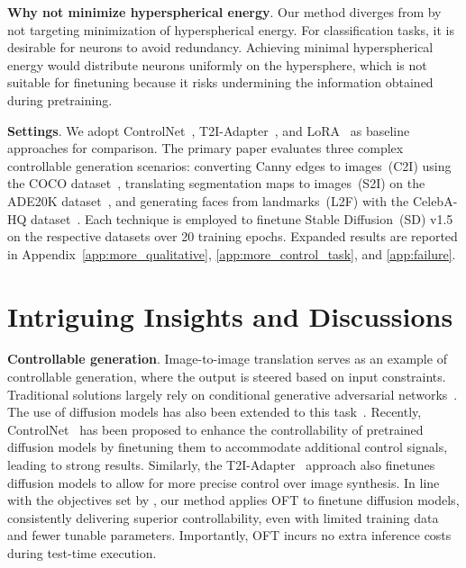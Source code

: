 \textbf{Why not minimize hyperspherical energy}. Our method diverges from \cite{liu2021orthogonal} by not targeting minimization of hyperspherical energy. For classification tasks, it is desirable for neurons to avoid redundancy. Achieving minimal hyperspherical energy would distribute neurons uniformly on the hypersphere, which is not suitable for finetuning because it risks undermining the information obtained during pretraining.

\textbf{Settings}. We adopt ControlNet~\cite{zhang2023adding}, T2I-Adapter~\cite{mou2023t2i}, and LoRA~\cite{hulora2022} as baseline approaches for comparison. The primary paper evaluates three complex controllable generation scenarios: converting Canny edges to images~(C2I) using the COCO dataset~\cite{lin2014microsoft}, translating segmentation maps to images~(S2I) on the ADE20K dataset~\cite{zhou2017scene}, and generating faces from landmarks~(L2F) with the CelebA-HQ dataset~\cite{karras2018progressive,xia2021tedigan}. Each technique is employed to finetune Stable Diffusion~(SD) v1.5 on the respective datasets over 20 training epochs. Expanded results are reported in Appendix~\ref{app:more_qualitative}, \ref{app:more_control_task}, and \ref{app:failure}.

\section{Intriguing Insights and Discussions}

\textbf{Controllable generation}. Image-to-image translation serves as an example of controllable generation, where the output is steered based on input constraints. Traditional solutions largely rely on conditional generative adversarial networks~\cite{isola2017image,zhu2017toward,wang2018high,park2019semantic,choi2018stargan}. The use of diffusion models has also been extended to this task~\cite{saharia2022palette,voynov2022sketch,wang2022pretraining}. Recently, ControlNet~\cite{zhang2023adding} has been proposed to enhance the controllability of pretrained diffusion models by finetuning them to accommodate additional control signals, leading to strong results. Similarly, the T2I-Adapter~\cite{mou2023t2i} approach also finetunes diffusion models to allow for more precise control over image synthesis. In line with the objectives set by \cite{zhang2023adding,mou2023t2i}, our method applies OFT to finetune diffusion models, consistently delivering superior controllability, even with limited training data and fewer tunable parameters. Importantly, OFT incurs no extra inference costs during test-time execution.

